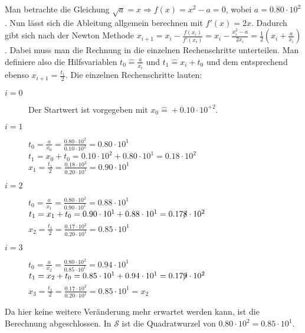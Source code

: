 \documentclass[a4paper,11pt]{article}             %
\begin{document}
Man betrachte die Gleichung $\sqrt{a} = x \Rightarrow f(x) = x^2 - a = 0$, wobei $a = 0.80 \cdot 10^2$. Nun lässt sich die Ableitung allgemein berechnen mit $f'(x) = 2x$. Dadurch gibt sich nach der Newton Methode $x_{i+1} = x_i - \frac{f(x_i)}{f'(x_i)} = x_i - \frac{x_i^2 - a}{2x_i} = \frac{1}{2} \left ( x_i + \frac{a}{x_i} \right )$. Dabei muss man die Rechnung in die einzelnen Rechenschritte unterteilen. Man definiere also die Hilfsvariablen $t_0 \hat{=} \frac{a}{x_i}$ und $t_1 \hat{=} x_i + t_0$ und dem entsprechend ebenso $x_{i+1} = \frac{t_1}{2}$. Die einzelnen Rechenschritte lauten: 
\begin{description}
\item [$i=0$]
Der Startwert ist vorgegeben mit $x_0 \hat{=} +0.10 \cdot 10^{+2}$.

\item [$i=1$]
$t_0 = \frac{a}{x_0} = \frac{0.80 \cdot 10^2}{0.10 \cdot 10^2} =0.80 \cdot 10^1$\\
$t_1 = x_0 + t_0 = 0.10 \cdot 10^2 + 0.80 \cdot 10^1 = 0.18 \cdot 10^2$\\
$x_1 = \frac{t_1}{2} = \frac{0.18 \cdot 10^2}{0.20 \cdot 10^1} = 0.90 \cdot 10^1$

\item [$i=2$]
$t_0 = \frac{a}{x_1} = \frac{0.80 \cdot 10^2}{0.90 \cdot 10^1} =0.88 \cdot 10^1$\\
$t_1 = x_1 + t_0 = 0.90 \cdot 10^1 + 0.88 \cdot 10^1 = 0.17\xout{8} \cdot 10^2$\\
$x_2 = \frac{t_1}{2} = \frac{0.17 \cdot 10^2}{0.20 \cdot 10^1} = 0.85 \cdot 10^1$

\item [$i=3$]
$t_0 = \frac{a}{x_2} = \frac{0.80 \cdot 10^2}{0.85 \cdot 10^1} =0.94 \cdot 10^1$\\
$t_1 = x_2 + t_0 = 0.85 \cdot 10^1 + 0.94 \cdot 10^1 = 0.17\xout{9} \cdot 10^2$\\
$x_3 = \frac{t_1}{2} = \frac{0.17 \cdot 10^2}{0.20 \cdot 10^1} = 0.85 \cdot 10^1 = x_2$
\end{description}
Da hier keine weitere Veränderung mehr erwartet werden kann, ist die Berechnung abgeschlossen. In $\mathcal{S}$ ist die Quadratwurzel von $0.80 \cdot 10^2 = 0.85 \cdot 10^1$.
\end{document}

